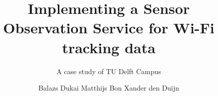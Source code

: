 \documentclass{tudelft-report}
\begin{document}
\frontmatter
\title[tudelft-white]{\fontsize{30}{5}\selectfont Implementing a Sensor Observation Service for Wi-Fi tracking data}
\subtitle[tudelft-white]{\fontsize{20}{1.2}\selectfont A case study of TU Delft Campus}
\author[tudelft-white]{\fontsize{15}{10}\selectfont Balazs Dukai
\vskip 0.15cm Matthijs Bon
\vskip 0.15cm Xander den Duijn}
\makecover[split]
	



\tableofcontents

\mainmatter
%





%
\nocite{*}
\printbibliography
\end{document}
